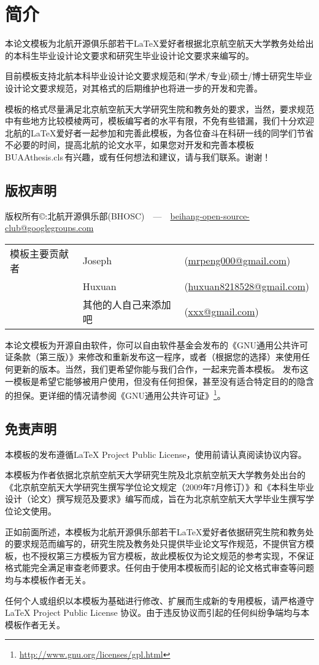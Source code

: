 \chapter{简介}
	本论文模板为北航开源俱乐部若干\LaTeX{}爱好者根据北京航空航天大学教务处给出的本科生毕业设计论文要求和研究生毕业设计论文要求来编写的。\par
	目前模板支持北航本科毕业设计论文要求规范和(学术/专业)硕士/博士研究生毕业设计论文要求规范，对其格式的后期维护也将进一步的开发和完善。\par
	模板的格式尽量满足北京航空航天大学研究生院和教务处的要求，当然，要求规范中有些地方比较模棱两可，模板编写者的水平有限，不免有些错漏，我们十分欢迎北航的\LaTeX{}爱好者一起参加和完善此模板，为各位奋斗在科研一线的同学们节省不必要的时间，提高北航的论文水平，如果您对开发和完善本模板\,BUAAthesis.cls\,有兴趣，或有任何想法和建议，请与我们联系。谢谢！
	\section{版权声明}
版权所有\copyright :北航开源俱乐部(BHOSC)~~---~~\href{mailto:beihang-open-source-club@googlegroups.com}{beihang-open-source-club@googlegroups.com}
	\begin{tabular}{lll}
模板主要贡献者 & Joseph\quad & (\href{mailto:mrpeng000@gmail.com}{mrpeng000@gmail.com})\\
		 ~ & Huxuan & (\href{mailto:huxuan8218528@gmail.com}{huxuan8218528@gmail.com})\\
		~~ & 其他的人自己来添加吧 & (\href{mailto:xxx@gmail.com}{xxx@gmail.com})\\   
	\end{tabular}
	\newline
\qquad 本论文模板为开源自由软件，你可以自由软件基金会发布的《GNU通用公共许可证条款（第三版）》来修改和重新发布这一程序，或者（根据您的选择）来使用任何更新的版本。当然，我们更希望你能与我们合作，一起来完善本模板。
	发布这一模板是希望它能够被用户使用，但没有任何担保，甚至没有适合特定目的的隐含的担保。更详细的情况请参阅《GNU通用公共许可证》\footnote{\url{http://www.gnu.org/licenses/gpl.html}}。

	\section{免责声明}
	本模板的发布遵循\LaTeX{} Project Public License，使用前请认真阅读协议内容。\par
	本模板为作者依据北京航空航天大学研究生院及北京航空航天大学教务处出台的《北京航空航天大学研究生撰写学位论文规定（2009年7月修订）》和《本科生毕业设计（论文）撰写规范及要求》编写而成，旨在为北京航空航天大学毕业生撰写学位论文使用。\par
	正如前面所述，本模板为北航开源俱乐部若干\LaTeX{}爱好者依据研究生院和教务处的要求规范而编写的，研究生院及教务处只提供毕业论文写作规范，不提供官方模板，也不授权第三方模板为官方模板，故此模板仅为论文规范的参考实现，不保证格式能完全满足审查老师要求。任何由于使用本模板而引起的论文格式审查等问题均与本模板作者无关。\par
	任何个人或组织以本模板为基础进行修改、扩展而生成新的专用模板，请严格遵守\LaTeX{} Project Public License 协议。由于违反协议而引起的任何纠纷争端均与本模板作者无关。
